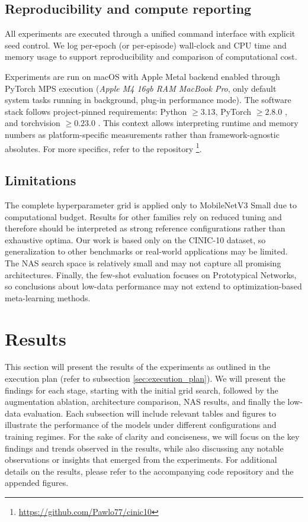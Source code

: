 \documentclass[cameraready]{Interspeech}
\begin{document}
\subsection{Reproducibility and compute reporting}
All experiments are executed through a unified command interface with explicit seed control. We log per-epoch (or per-episode) wall-clock and CPU time and memory usage to support reproducibility and comparison of computational cost.

Experiments are run on macOS with Apple Metal backend enabled through PyTorch MPS execution (\textit{Apple M4 16gb RAM MacBook Pro}, only default system tasks running in background, plug-in performance mode). The software stack follows project-pinned requirements: Python $\geq 3.13$, PyTorch $\geq 2.8.0$ \cite{NEURIPS2019_9015}, and torchvision $\geq 0.23.0$ \cite{torchvision}. This context allows interpreting runtime and memory numbers as platform-specific measurements rather than framework-agnostic absolutes. For more specifics, refer to the repository \footnote{\url{https://github.com/Pawlo77/cinic10}}.

\subsection{Limitations}
The complete hyperparameter grid is applied only to MobileNetV3 Small due to computational budget. Results for other families rely on reduced tuning and therefore should be interpreted as strong reference configurations rather than exhaustive optima. Our work is based only on the CINIC-10 dataset, so generalization to other benchmarks or real-world applications may be limited. The NAS search space is relatively small and may not capture all promising architectures. Finally, the few-shot evaluation focuses on Prototypical Networks, so conclusions about low-data performance may not extend to optimization-based meta-learning methods.

\section{Results}
This section will present the results of the experiments as outlined in the execution plan (refer to subsection \ref{sec:execution_plan}). We will present the findings for each stage, starting with the initial grid search, followed by the augmentation ablation, architecture comparison, NAS results, and finally the low-data evaluation. Each subsection will include relevant tables and figures to illustrate the performance of the models under different configurations and training regimes. For the sake of clarity and conciseness, we will focus on the key findings and trends observed in the results, while also discussing any notable observations or insights that emerged from the experiments. For additional details on the results, please refer to the accompanying code repository and the appended figures.
\end{document}
